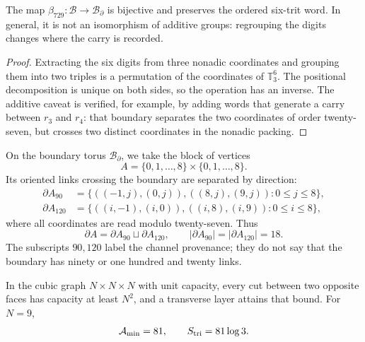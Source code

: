 \begin{proposition}
\label{prop:modular-beta729}
The map \(\beta_{729}:\mathcal B\to\mathcal B_\partial\) is bijective and
preserves the ordered six-trit word. In general, it is not an
isomorphism of additive groups: regrouping the digits changes where the
carry is recorded.
\end{proposition}

\begin{proof}
Extracting the six digits from three nonadic coordinates and grouping them into
two triples is a permutation of the coordinates of \(\mathbb T_3^6\). The
positional decomposition is unique on both sides, so the
operation has an inverse. The additive caveat is verified, for example,
by adding words that generate a carry between \(r_3\) and \(r_4\): that
boundary separates the two coordinates of order twenty-seven, but crosses
two distinct coordinates in the nonadic packing.
\end{proof}

On the boundary torus \(\mathcal B_\partial\), we take the block of vertices
\begin{equation}
\label{eq:modular-block-A}
A=\{0,1,\ldots,8\}\times\{0,1,\ldots,8\}.
\end{equation}
Its oriented links crossing the boundary are separated by direction:
\begin{align}
\partial A_{90}
&=\{((-1,j),(0,j)),((8,j),(9,j)):0\leq j\leq8\},
\label{eq:modular-boundary90}\\
\partial A_{120}
&=\{((i,-1),(i,0)),((i,8),(i,9)):0\leq i\leq8\},
\label{eq:modular-boundary120}
\end{align}
where all coordinates are read modulo twenty-seven. Thus
\begin{equation}
\label{eq:modular-boundary-counts}
\partial A=\partial A_{90}\sqcup\partial A_{120},
\qquad
|\partial A_{90}|=|\partial A_{120}|=18.
\end{equation}
The subscripts \(90,120\) label the channel provenance; they do not say that
the boundary has ninety or one hundred and twenty links.

\begin{theorem}
\label{thm:modular-triadic-cut}
In the cubic graph \(N\times N\times N\) with unit capacity, every
cut between two opposite faces has capacity at least \(N^2\), and a
transverse layer attains that bound. For \(N=9\),
\begin{equation}
\label{eq:modular-mincut-entropy}
\mathcal A_{\min}=81,
\qquad
S_{\rm tri}=81\log3.
\end{equation}
\end{theorem}

